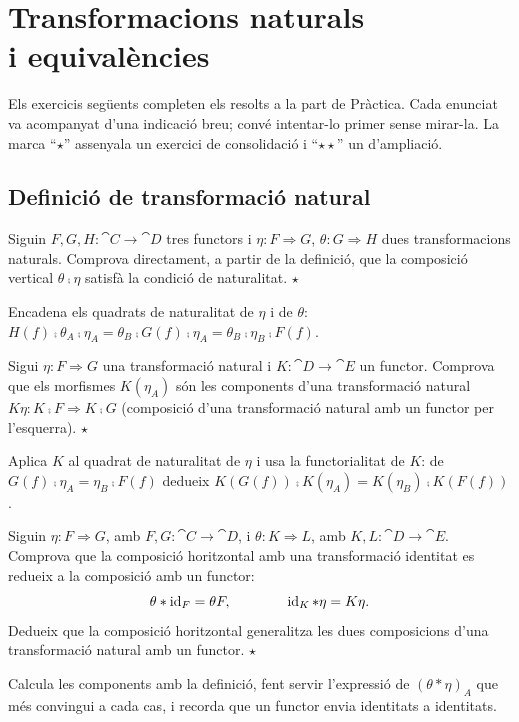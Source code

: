 \chapter[Transformacions naturals]{\texorpdfstring{Transformacions naturals\\ i equivalències}{Transformacions naturals i equivalències}}

Els exercicis següents completen els resolts a la part de Pràctica. Cada enunciat va acompanyat d'una indicació breu; convé intentar-lo primer sense mirar-la. La marca \enquote{$\star$} assenyala un exercici de consolidació i \enquote{$\star\star$} un d'ampliació.

\section{Definició de transformació natural}

\begin{exercici}
Siguin $F,G,H\colon\cat{C}\to\cat{D}$ tres functors i $\eta\colon F\Rightarrow G$, $\theta\colon G\Rightarrow H$ dues transformacions naturals. Comprova directament, a partir de la definició, que la composició vertical $\theta\comp\eta$ satisfà la condició de naturalitat. \hfill{\normalfont$\star$}
\begin{indicacio}
Encadena els quadrats de naturalitat de $\eta$ i de $\theta$: $H(f)\comp\theta_A\comp\eta_A=\theta_B\comp G(f)\comp\eta_A=\theta_B\comp\eta_B\comp F(f)$.
\end{indicacio}
\end{exercici}

\begin{exercici}
Sigui $\eta\colon F\Rightarrow G$ una transformació natural i $K\colon\cat{D}\to\cat{E}$ un functor. Comprova que els morfismes $K(\eta_A)$ són les components d'una transformació natural $K\eta\colon K\comp F\Rightarrow K\comp G$ (composició d'una transformació natural amb un functor per l'esquerra). \hfill{\normalfont$\star$}
\begin{indicacio}
Aplica $K$ al quadrat de naturalitat de $\eta$ i usa la functorialitat de $K$: de $G(f)\comp\eta_A=\eta_B\comp F(f)$ dedueix $K(G(f))\comp K(\eta_A)=K(\eta_B)\comp K(F(f))$.
\end{indicacio}
\end{exercici}

\begin{exercici}
Siguin $\eta\colon F\Rightarrow G$, amb $F,G\colon\cat{C}\to\cat{D}$, i $\theta\colon K\Rightarrow L$, amb $K,L\colon\cat{D}\to\cat{E}$. Comprova que la composició horitzontal amb una transformació identitat es redueix a la composició amb un functor:
\[
\theta\ast\operatorname{id}_F=\theta F,
\qquad\qquad
\operatorname{id}_K\ast\eta=K\eta.
\]
Dedueix que la composició horitzontal generalitza les dues composicions d'una transformació natural amb un functor. \hfill{\normalfont$\star$}
\begin{indicacio}
Calcula les components amb la definició, fent servir l'expressió de $(\theta\ast\eta)_A$ que més convingui a cada cas, i recorda que un functor envia identitats a identitats.
\end{indicacio}
\end{exercici}

